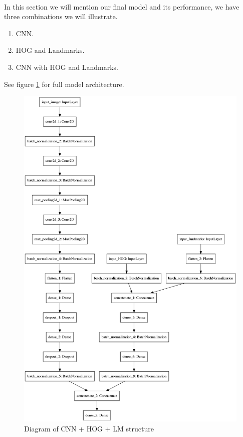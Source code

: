 \paragraph{}
In this section we will mention our final model and its performance, we have three combinations we will illustrate.

\begin{enumerate}
	\item CNN.
	\item HOG and Landmarks.
	\item CNN with HOG and Landmarks.
\end{enumerate}
See figure \ref{cnn_lm_hog} for full model architecture.
\begin{figure}
	\centering
	\includegraphics[width=1\textwidth]{images/cnn_hog_lm.png}
	\caption{Diagram of CNN + HOG + LM structure}
	\label{cnn_lm_hog}
\end{figure}
